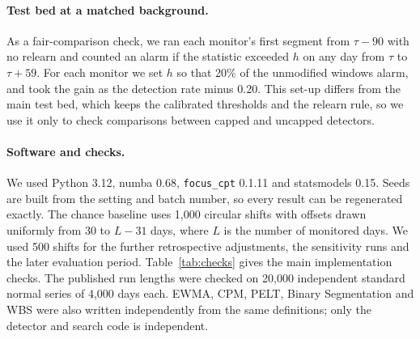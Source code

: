 \paragraph{Test bed at a matched background.} As a fair-comparison check, we ran each monitor's first segment from $\tau-90$ with no relearn and counted an alarm if the statistic exceeded $h$ on any day from $\tau$ to $\tau+59$. For each monitor we set $h$ so that 20\% of the unmodified windows alarm, and took the gain as the detection rate minus 0.20. This set-up differs from the main test bed, which keeps the calibrated thresholds and the relearn rule, so we use it only to check comparisons between capped and uncapped detectors.

\paragraph{Software and checks.} We used Python 3.12, numba 0.68, \texttt{focus\_cpt} 0.1.11 and statsmodels 0.15. Seeds are built from the setting and batch number, so every result can be regenerated exactly. The chance baseline uses 1,000 circular shifts with offsets drawn uniformly from 30 to $L-31$ days, where $L$ is the number of monitored days. We used 500 shifts for the further retrospective adjustments, the sensitivity runs and the later evaluation period. Table~\ref{tab:checks} gives the main implementation checks. The published run lengths were checked on 20,000 independent standard normal series of 4,000 days each. EWMA, CPM, PELT, Binary Segmentation and WBS were also written independently from the same definitions; only the detector and search code is independent.

